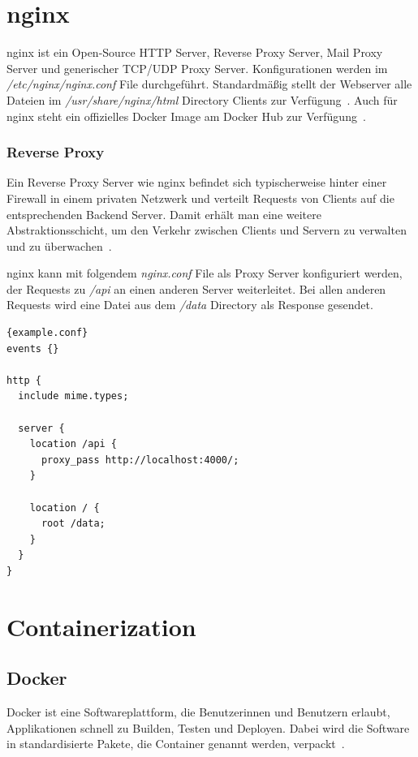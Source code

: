 \section{nginx}
nginx ist ein Open-Source HTTP Server, Reverse Proxy Server, Mail Proxy Server und generischer TCP/UDP Proxy Server.
Konfigurationen werden im \textit{/etc/nginx/nginx.conf} File durchgeführt.
 Standardmäßig stellt der Webserver alle Dateien im \textit{/usr/share/nginx/html} Directory Clients zur
 Verfügung~\cite{nginx}.
 Auch für nginx steht ein offizielles Docker Image am Docker Hub zur Verfügung~\cite{nginx-dockerhub}.

\subsubsection{Reverse Proxy}
Ein Reverse Proxy Server wie nginx befindet sich typischerweise hinter einer Firewall in einem
privaten Netzwerk und verteilt Requests von Clients auf die entsprechenden Backend Server.
Damit erhält man eine weitere Abstraktionsschicht, um den Verkehr zwischen Clients und Servern zu
verwalten und zu überwachen~\cite{nginx-proxy-server}.

nginx kann mit folgendem \textit{nginx.conf} File als Proxy Server konfiguriert werden, der Requests zu \textit{/api}
an einen anderen Server weiterleitet.
Bei allen anderen Requests wird eine Datei aus dem \textit{/data} Directory als Response gesendet.

\begin{lstlisting}[label={lst:example.conf}]{example.conf}
events {}

http {
  include mime.types;

  server {
    location /api {
      proxy_pass http://localhost:4000/;
    }

    location / {
      root /data;
    }
  }
}
\end{lstlisting}

\section{Containerization}
\subsection{Docker}
 Docker ist eine Softwareplattform, die Benutzerinnen und Benutzern erlaubt, Applikationen schnell zu
 Builden, Testen und Deployen.
 Dabei wird die Software in standardisierte Pakete, die Container genannt werden, verpackt~\cite{docker-aws}.


